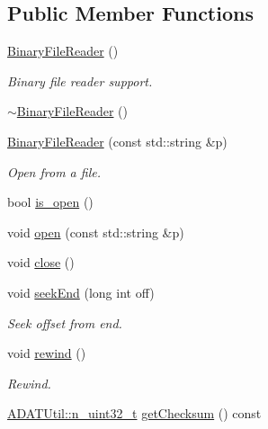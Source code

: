 \subsection*{Public Member Functions}
\begin{DoxyCompactItemize}
\item 
\mbox{\hyperlink{classADATIO_1_1BinaryFileReader_a77475e594db53a85f7f15050a442faa1}{Binary\+File\+Reader}} ()
\begin{DoxyCompactList}\small\item\em Binary file reader support. \end{DoxyCompactList}\item 
\mbox{\hyperlink{classADATIO_1_1BinaryFileReader_aa0905fcdd1723ce850a89baf9a111345}{$\sim$\+Binary\+File\+Reader}} ()
\item 
\mbox{\hyperlink{classADATIO_1_1BinaryFileReader_a987273f138d0fcc4a1e9a95c51b093ef}{Binary\+File\+Reader}} (const std\+::string \&p)
\begin{DoxyCompactList}\small\item\em Open from a file. \end{DoxyCompactList}\item 
bool \mbox{\hyperlink{classADATIO_1_1BinaryFileReader_a679fa9d101de2993355f4dd193d4f64d}{is\+\_\+open}} ()
\item 
void \mbox{\hyperlink{classADATIO_1_1BinaryFileReader_a5a7c5bb025902fd04642fb154542dc6a}{open}} (const std\+::string \&p)
\item 
void \mbox{\hyperlink{classADATIO_1_1BinaryFileReader_af0501cb948e5220209226970867dbb26}{close}} ()
\item 
void \mbox{\hyperlink{classADATIO_1_1BinaryFileReader_a1ae70d2eb56f1c1b1769ce9557f8ebbf}{seek\+End}} (long int off)
\begin{DoxyCompactList}\small\item\em Seek offset from end. \end{DoxyCompactList}\item 
void \mbox{\hyperlink{classADATIO_1_1BinaryFileReader_a4f15e41f00be97ad3a0e8bb97c90b704}{rewind}} ()
\begin{DoxyCompactList}\small\item\em Rewind. \end{DoxyCompactList}\item 
\mbox{\hyperlink{namespaceADATUtil_ad945a8afa4db2d1f89b731964adae97e}{A\+D\+A\+T\+Util\+::n\+\_\+uint32\+\_\+t}} \mbox{\hyperlink{classADATIO_1_1BinaryFileReader_addb0cfdf4c3df174327b1abc136cfc68}{get\+Checksum}} () const

\end{DoxyCompactItemize}
